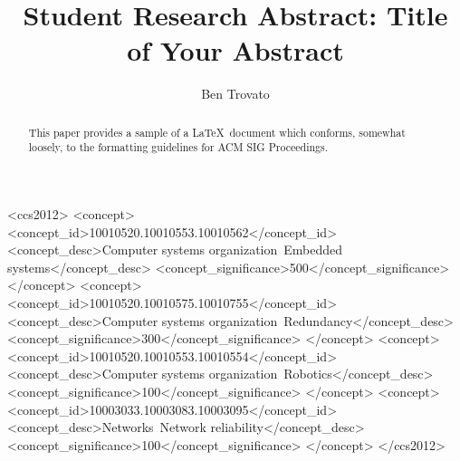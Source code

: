 \documentclass[sigconf]{acmart}
\begin{document}
\title{Student Research Abstract: Title of Your Abstract}



\author{Ben Trovato}

\renewcommand{\shortauthors}{B. Trovato et al.}

\begin{abstract}
This paper provides a sample of a \LaTeX\ document which conforms,
somewhat loosely, to the formatting guidelines for
ACM SIG Proceedings.
\end{abstract}

%
%
\begin{CCSXML}
<ccs2012>
 <concept>
  <concept_id>10010520.10010553.10010562</concept_id>
  <concept_desc>Computer systems organization~Embedded systems</concept_desc>
  <concept_significance>500</concept_significance>
 </concept>
 <concept>
  <concept_id>10010520.10010575.10010755</concept_id>
  <concept_desc>Computer systems organization~Redundancy</concept_desc>
  <concept_significance>300</concept_significance>
 </concept>
 <concept>
  <concept_id>10010520.10010553.10010554</concept_id>
  <concept_desc>Computer systems organization~Robotics</concept_desc>
  <concept_significance>100</concept_significance>
 </concept>
 <concept>
  <concept_id>10003033.10003083.10003095</concept_id>
  <concept_desc>Networks~Network reliability</concept_desc>
  <concept_significance>100</concept_significance>
 </concept>
</ccs2012>  
\end{CCSXML}

\end{document}

